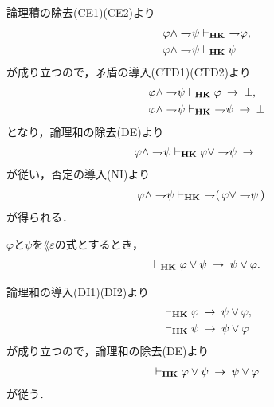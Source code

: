 	\begin{sketch}
		論理積の除去(CE1)(CE2)より
		\begin{align}
			\varphi \wedge \rightharpoondown\hspace{-0.25em} \psi &\vdash_{{\scriptsize \mbox{{\bf HK}}}}\ \rightharpoondown\hspace{-0.25em} \varphi, \\
			\varphi \wedge \rightharpoondown\hspace{-0.25em} \psi &\vdash_{{\scriptsize \mbox{{\bf HK}}}} \psi
		\end{align}
		が成り立つので，矛盾の導入(CTD1)(CTD2)より
		\begin{align}
			\varphi \wedge \negation \psi &\provable{\mbox{{\bf HK}}}
			\varphi \rarrow \bot, \\
			\varphi \wedge \negation \psi &\provable{\mbox{{\bf HK}}}\ 
			\negation \psi \rarrow \bot
		\end{align}
		となり，論理和の除去(DE)より
		\begin{align}
			\varphi \wedge \rightharpoondown\hspace{-0.25em} \psi &\vdash_{{\scriptsize \mbox{{\bf HK}}}}
			\varphi \vee \rightharpoondown\hspace{-0.25em} \psi \hspace{0.25em}\rightarrow\hspace{0.25em} \bot
		\end{align}
		が従い，否定の導入(NI)より
		\begin{align}
			\varphi \wedge \negation \psi &\provable{\mbox{{\bf HK}}}\ 
			\negation (\, \varphi \vee \negation \psi\, )
		\end{align}
		が得られる．
		\QED
	\end{sketch}
	
	\begin{screen}
		\begin{thm}[論理和の対称律]
		\label{classic:symmetry_of_disjunction}
			$\varphi$と$\psi$を$\lang{\varepsilon}$の式とするとき，
			\begin{align}
				\vdash_{{\scriptsize \mbox{{\bf HK}}}} 
				\varphi \vee \psi \hspace{0.25em}\rightarrow\hspace{0.25em} \psi \vee \varphi.
			\end{align}
		\end{thm}
	\end{screen}
	
	\begin{sketch}
		論理和の導入(DI1)(DI2)より
		\begin{align}
			&\vdash_{{\scriptsize \mbox{{\bf HK}}}} \varphi \hspace{0.25em}\rightarrow\hspace{0.25em} \psi \vee \varphi, \\
			&\vdash_{{\scriptsize \mbox{{\bf HK}}}} \psi \hspace{0.25em}\rightarrow\hspace{0.25em} \psi \vee \varphi
		\end{align}
		が成り立つので，論理和の除去(DE)より
		\begin{align}
			\vdash_{{\scriptsize \mbox{{\bf HK}}}} \varphi \vee \psi \hspace{0.25em}\rightarrow\hspace{0.25em} \psi \vee \varphi
		\end{align}
		が従う．
		\QED
	\end{sketch}
	
